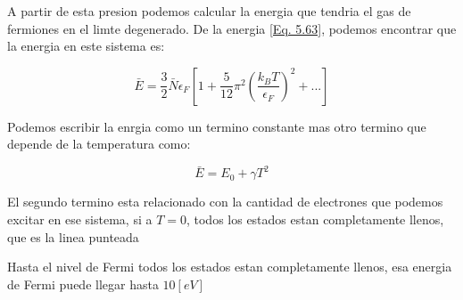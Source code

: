 \documentclass[11pt,fleqn]{book}
\begin{document}
A partir de esta presion podemos calcular la energia que tendria el gas de fermiones en el limte degenerado. De la energia \ref{Eq. 5.63}, podemos encontrar que la energia en este sistema es:

\begin{equation}
    \bar{E}=\frac{3}{2}\bar{N}\epsilon_{F}\left[1+\frac{5}{12}\pi^{2}\left(\frac{k_{B}T}{\epsilon_{F}}\right)^{2}+...\right]
\end{equation}

Podemos escribir la enrgia como un termino constante mas otro termino que depende de la temperatura como:

\begin{equation}
    \bar{E}=E_{0}+\gamma T^{2}
\end{equation}

El segundo termino esta relacionado con la cantidad de electrones que podemos excitar en ese sistema, si a $T=0$, todos los estados estan completamente llenos, que es la linea punteada


Hasta el nivel de Fermi todos los estados estan completamente llenos, esa energia de Fermi puede llegar hasta $10 [eV]$








 


%
%


\end{document}
